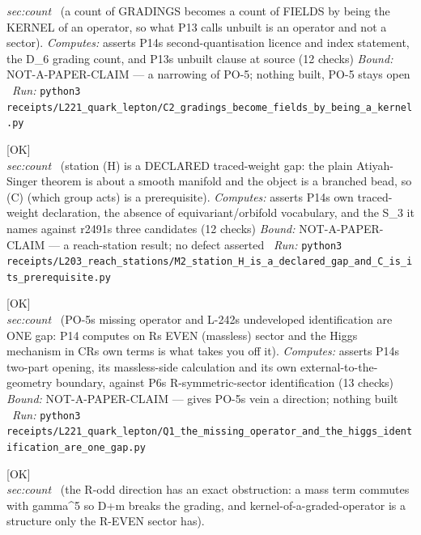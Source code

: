 \begin{description}
\textit{sec:count} \ (a count of GRADINGS becomes a count of FIELDS by being the KERNEL of an operator, so what P13 calls unbuilt is an operator and not a sector). 
\emph{Computes:} asserts P14s second-quantisation licence and index statement, the D\_6 grading count, and P13s unbuilt clause at source (12 checks)
 \emph{Bound:} NOT-A-PAPER-CLAIM --- a narrowing of PO-5; nothing built, PO-5 stays open
\ \emph{Run:} \texttt{python3 receipts/L221\_quark\_lepton/C2\_gradings\_become\_fields\_by\_being\_a\_kernel.py}
\item[\label{rcpt:M2_station_H_is_a_declared_gap_and_C_is_its_prerequisite}\textbf{}\quad\texttt{M2\_station\_H\_is\_a\_declared\_gap\_and\_C\_is\_its\_prerequisite}]\hfill\textsf{[OK]}\\
\textit{sec:count} \ (station (H) is a DECLARED traced-weight gap: the plain Atiyah-Singer theorem is about a smooth manifold and the object is a branched bead, so (C) (which group acts) is a prerequisite). 
\emph{Computes:} asserts P14s own traced-weight declaration, the absence of equivariant/orbifold vocabulary, and the S\_3 it names against r2491s three candidates (12 checks)
 \emph{Bound:} NOT-A-PAPER-CLAIM --- a reach-station result; no defect asserted
\ \emph{Run:} \texttt{python3 receipts/L203\_reach\_stations/M2\_station\_H\_is\_a\_declared\_gap\_and\_C\_is\_its\_prerequisite.py}
\item[\label{rcpt:Q1_the_missing_operator_and_the_higgs_identification_are_one_gap}\textbf{}\quad\texttt{Q1\_the\_missing\_operator\_and\_the\_higgs\_identification\_are\_one\_gap}]\hfill\textsf{[OK]}\\
\textit{sec:count} \ (PO-5s missing operator and L-242s undeveloped identification are ONE gap: P14 computes on Rs EVEN (massless) sector and the Higgs mechanism in CRs own terms is what takes you off it). 
\emph{Computes:} asserts P14s two-part opening, its massless-side calculation and its own external-to-the-geometry boundary, against P6s R-symmetric-sector identification (13 checks)
 \emph{Bound:} NOT-A-PAPER-CLAIM --- gives PO-5s vein a direction; nothing built
\ \emph{Run:} \texttt{python3 receipts/L221\_quark\_lepton/Q1\_the\_missing\_operator\_and\_the\_higgs\_identification\_are\_one\_gap.py}
\item[\label{rcpt:Q2_the_kernel_route_is_unavailable_off_the_R_even_sector}\textbf{}\quad\texttt{Q2\_the\_kernel\_route\_is\_unavailable\_off\_the\_R\_even\_sector}]\hfill\textsf{[OK]}\\
\textit{sec:count} \ (the R-odd direction has an exact obstruction: a mass term commutes with gamma\textasciicircum{}5 so D+m breaks the grading, and kernel-of-a-graded-operator is a structure only the R-EVEN sector has). 

\end{description}
